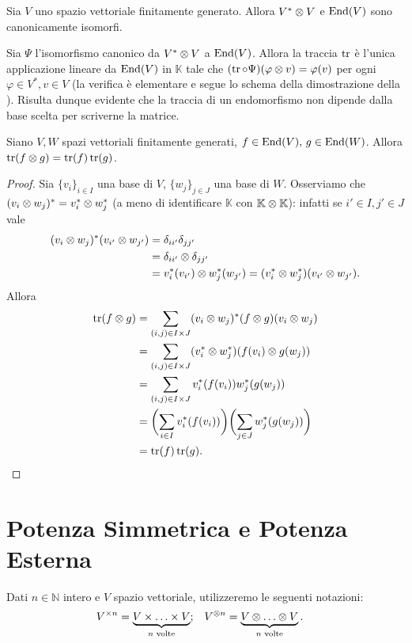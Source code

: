 \begin{corollary}
Sia $V$ uno spazio vettoriale finitamente generato. Allora $V^*\otimes V$ e $\operatorname{End}(V)$ sono canonicamente isomorfi.
\end{corollary}

\begin{example}
Sia $\Psi$ l'isomorfismo canonico da $V^*\otimes V$ a $\operatorname{End}(V)$. Allora la traccia $\operatorname{tr}$ è l'unica applicazione lineare da $\operatorname{End}(V)$ in $\mathbb{K}$ tale che $(\operatorname{tr}\circ\Psi)(\varphi\otimes v)=\varphi(v)$ per ogni $\varphi\in V^*,v\in V$ (la verifica è elementare e segue lo schema della dimostrazione della ). Risulta dunque evidente che la traccia di un endomorfismo non dipende dalla base scelta per scriverne la matrice.
\end{example}

\begin{proposition}
Siano $V\comma W$ spazi vettoriali finitamente generati, $f\in\operatorname{End}(V),\,\allowbreak g\in\operatorname{End}(W)$. Allora $\operatorname{tr}(f\otimes g)=\operatorname{tr}(f)\operatorname{tr}(g)$.
\end{proposition}
\begin{proof}
Sia $\{v_i\}_{i\in I}$ una base di $V$, $\{w_j\}_{j\in J}$ una base di $W$. Osserviamo che $(v_i\otimes w_j)^*=v_i^*\otimes w_j^*$ (a meno di identificare $\mathbb{K}$ con $\mathbb{K}\otimes\mathbb{K}$): infatti se $i'\in I\comma j'\in J$ vale 
\begin{align*}
(v_i\otimes w_j)^*(v_{i'}\otimes w_{j'})&=\delta_{ii'}\delta_{jj'}\\
&=\delta_{ii'}\otimes\delta_{jj'}\\&=v_i^*(v_{i'})\otimes w_j^*(w_{j'})=(v_i^*\otimes w_j^*)(v_{i'}\otimes w_{j'}).
\end{align*}
Allora
\begin{align*}
\operatorname{tr}(f\otimes g)&=\sum_{(i,j)\in I\times J}(v_i\otimes w_j)^*(f\otimes g)(v_i\otimes w_j)\\
&=\sum_{(i,j)\in I\times J}(v_i^*\otimes w_j^*)(f(v_i)\otimes g(w_j))\\
&=\sum_{(i,j)\in I\times J}v_i^*(f(v_i))w_j^*(g(w_j))\\
&=\biggl(\sum_{i\in I}v_i^*(f(v_i))\biggr)\biggl(\sum_{j\in J}w_j^*(g(w_j))\biggr)\\
&=\operatorname{tr}(f)\operatorname{tr}(g).
\end{align*}
\end{proof}

\section{Potenza Simmetrica e Potenza Esterna}
Dati $n\in\mathbb{N}$ intero e $V$ spazio vettoriale, utilizzeremo le seguenti notazioni:
\begin{align*}
V^{\times n}&=\underbrace{V\times\ldots\times V}_{\text{$n$ volte}};&V^{\otimes n}&=\underbrace{V\otimes\ldots\otimes V}_{\text{$n$ volte}}.
\end{align*}

